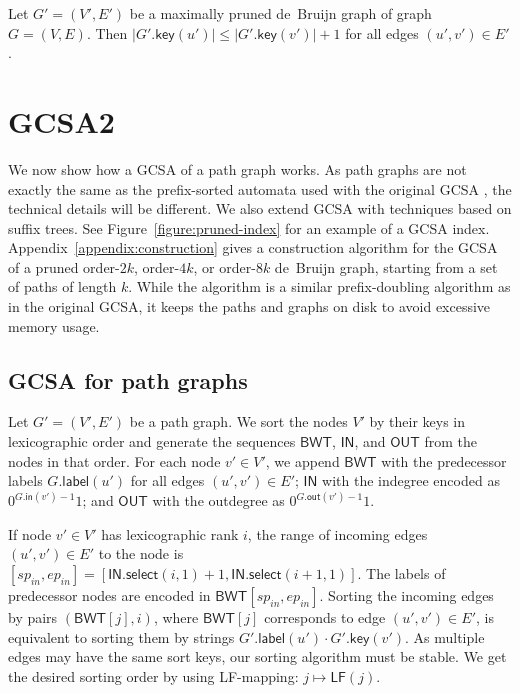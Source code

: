 \documentclass[a4paper,UKenglish]{lipics-v2016}
\newcommand{\abs}[1]{\ensuremath{\lvert #1 \rvert}}
\newcommand{\select}{\ensuremath{\mathsf{select}}}
\newcommand{\LF}{\ensuremath{\mathsf{LF}}}
\newcommand{\gindegree}{\ensuremath{\mathsf{in}}}
\newcommand{\goutdegree}{\ensuremath{\mathsf{out}}}
\newcommand{\glabel}{\ensuremath{\mathsf{label}}}
\newcommand{\gkey}{\ensuremath{\mathsf{key}}}
\newcommand{\orderk}[1]{order\nobreakdash-$#1$}
\newcommand{\LFmapping}{LF\nobreakdash-mapping}
\newcommand{\BWT}{\ensuremath{\mathsf{BWT}}}
\newcommand{\bvIN}{\ensuremath{\mathsf{IN}}}
\newcommand{\bvOUT}{\ensuremath{\mathsf{OUT}}}
\begin{document}
\begin{lemma}\label{lemma:dbg-maximal}
Let $G' = (V', E')$ be a maximally pruned de~Bruijn graph of graph $G = (V, E)$. Then $\abs{G'.\gkey(u')} \le \abs{G'.\gkey(v')}+1$ for all edges $(u', v') \in E'$.
\end{lemma}


\section{GCSA2}

We now show how a GCSA of a path graph works. As path graphs are not exactly the same as the prefix-sorted automata used with the original GCSA \cite{Siren2014}, the technical details will be different. We also extend GCSA with techniques based on suffix trees.
See Figure~\ref{figure:pruned-index} for an example of a GCSA index.
Appendix~\ref{appendix:construction} gives a construction algorithm for the GCSA of a pruned \orderk{2k}, \orderk{4k}, or \orderk{8k} de~Bruijn graph, starting from a set of paths of length $k$. While the algorithm is a similar prefix-doubling algorithm as in the original GCSA, it keeps the paths and graphs on disk to avoid excessive memory usage.

\subsection{GCSA for path graphs}

Let $G' = (V', E')$ be a path graph. We sort the nodes $V'$ by their keys in lexicographic order and generate the sequences $\BWT$, $\bvIN$, and $\bvOUT$ from the nodes in that order. For each node $v' \in V'$, we append $\BWT$ with the predecessor labels $G.\glabel(u')$ for all edges $(u', v') \in E'$; $\bvIN$ with the indegree encoded as $0^{G.\gindegree(v')-1} 1$; and $\bvOUT$ with the outdegree as $0^{G.\goutdegree(v')-1} 1$.

If node $v' \in V'$ has lexicographic rank $i$, the range of incoming edges $(u', v') \in E'$ to the node is $[sp_{in}, ep_{in}] = [\bvIN.\select(i, 1) + 1, \bvIN.\select(i+1, 1)]$. The labels of predecessor nodes are encoded in $\BWT[sp_{in}, ep_{in}]$. Sorting the incoming edges by pairs $(\BWT[j], i)$, where $\BWT[j]$ corresponds to edge $(u', v') \in E'$, is equivalent to sorting them by strings $G'.\glabel(u') \cdot G'.\gkey(v')$. As multiple edges may have the same sort keys, our sorting algorithm must be stable. We get the desired sorting order by using \LFmapping: $j \mapsto \LF(j)$.
\end{document}
